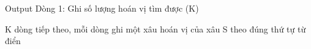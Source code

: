 Output
Dòng 1: Ghi số lượng hoán vị tìm được (K)  

   K dòng tiếp theo, mỗi dòng ghi một xâu hoán vị của xâu S theo đúng thứ tự từ điển